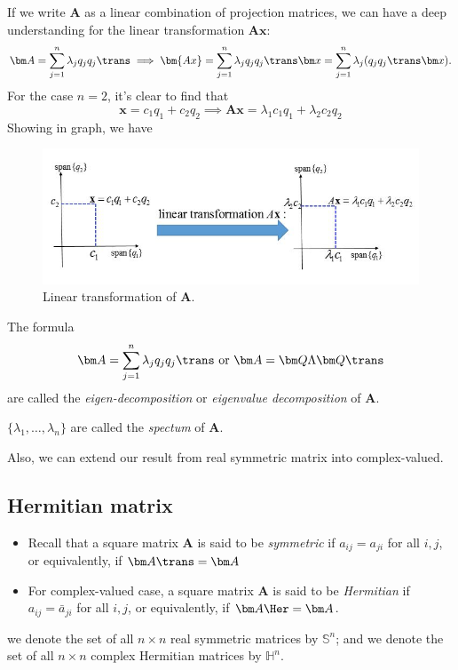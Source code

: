 \begin{example}
If we write $\bm A$ as a linear combination of projection matrices, we can have a deep understanding for the linear transformation $\bm{Ax}$:
\[
\bm A=\sum_{j=1}^{n}\lambda_jq_jq_j\trans
\implies
\bm{Ax}=\sum_{j=1}^{n}\lambda_jq_jq_j\trans\bm x=
\sum_{j=1}^{n}\lambda_j(q_jq_j\trans\bm x).
\]
For the case $n=2$, it's clear to find that
\[
\bm x=c_1q_1+c_2q_2\implies
\bm{Ax}=\lambda_1c_1q_1+\lambda_2c_2q_2
\]
Showing in graph, we have
\begin{figure}[H]
\centering\includegraphics[width=12cm]{week6/spec}
\caption{Linear transformation of $\bm A$.}
\end{figure}
\end{example}
\begin{remark}
The formula \[
\bm A=\sum_{j=1}^{n}\lambda_jq_jq_j\trans\mbox{ or }\bm A=\bm Q\Lambda\bm Q\trans
\] are called the \emph{eigen-decomposition} or \emph{eigenvalue decomposition} of $\bm A$.

$\{\lambda_1,\dots,\lambda_n\}$ are called the \emph{spectum} of $\bm A$.
\end{remark}
Also, we can extend our result from real symmetric matrix into complex-valued.
\subsection{Hermitian matrix}
\begin{definition}
\begin{itemize}
\item
Recall that a square matrix $\bm A$ is said to be \emph{symmetric} if $a_{ij}=a_{ji}$ for all $i,j$, or equivalently, if $\bm A\trans=\bm A$
\item
For complex-valued case, a square matrix $\bm A$ is said to be \emph{Hermitian} if $a_{ij}=\bar a_{ji}$ for all $i,j$, or equivalently, if $\bm A\Her=\bm A$.
\end{itemize}
we denote the set of all $n\times n$ real symmetric matrices by $\mathbb{S}^n$; and we denote the set of all $n\times n$ complex Hermitian matrices by $\mathbb{H}^n$.
\end{definition}

